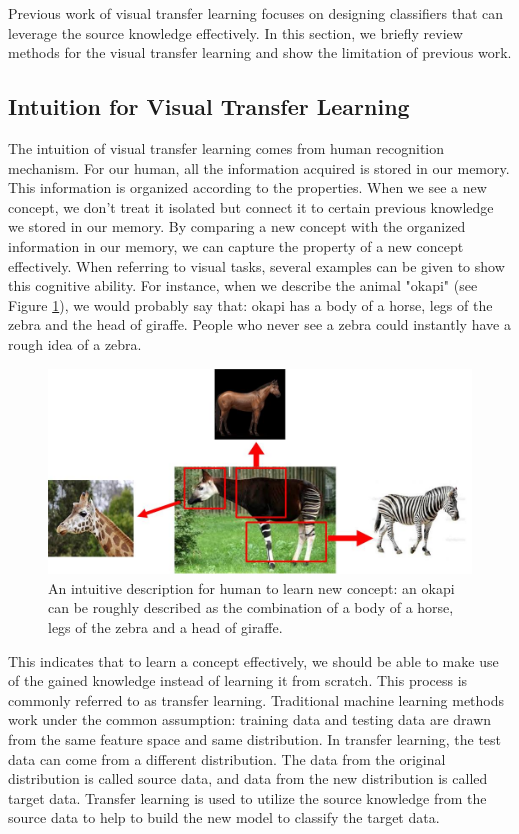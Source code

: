Previous work of visual transfer learning focuses on designing classifiers that can leverage the source knowledge effectively. In this section, we briefly review methods for the visual transfer learning and show the limitation of previous work. 
\subsection{Intuition for Visual Transfer Learning}
The intuition of visual transfer learning comes from human recognition mechanism. For our human, all the information acquired is stored in our memory. This information is organized according to the properties. When we see a new concept, we don't treat it isolated but connect it to certain previous knowledge we stored in our memory. By comparing a new concept with the organized information in our memory, we can capture the property of a new concept effectively. When referring to visual tasks, several examples can be given to show this cognitive ability. For instance, when we describe the animal "okapi" (see Figure \ref{fig:intro:multi}), we would probably say that: okapi has a body of a horse, legs of the zebra and the head of giraffe. People who never see a zebra could instantly have a rough idea of a zebra. 

\begin{figure}
	\centering
	\includegraphics[scale=.6]{introduction/fig/multiple.jpg}
	\caption{An intuitive description for human to learn new concept: an okapi can be roughly described as the combination of a body of a horse, legs of the zebra and a head of giraffe.}\label{fig:intro:multi}
\end{figure}

This indicates that to learn a concept effectively, we should be able to make use of the gained knowledge instead of learning it from scratch. This process is commonly referred to as transfer learning\cite{pan2010survey}. Traditional machine learning methods work under the common assumption: training data and testing data are drawn from the same feature space and same distribution. 
In transfer learning, the test data can come from a different distribution. The data from the original distribution is called source data, and data from the new distribution is called target data. Transfer learning is used to utilize the source knowledge from the source data to help to build the new model to classify the target data. 

